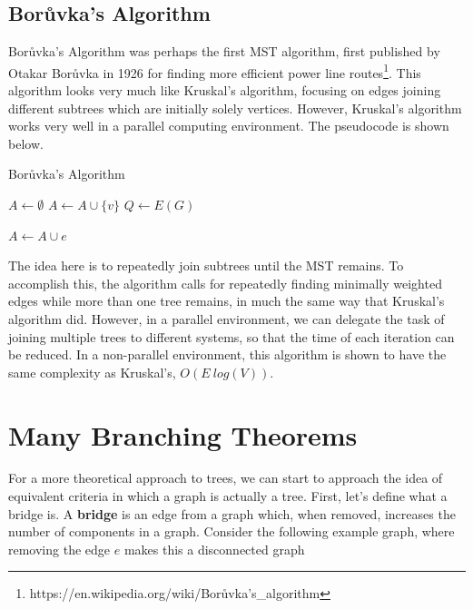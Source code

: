 \subsection{Bor\r{u}vka's Algorithm}
Bor\r{u}vka's Algorithm was perhaps the first MST algorithm, first published by Otakar Bor\r{u}vka in 1926 for finding more efficient power line routes\footnote{https://en.wikipedia.org/wiki/Borůvka's\_algorithm}. This algorithm looks very much like Kruskal's algorithm, focusing on edges joining different subtrees which are initially solely vertices. However, Kruskal's algorithm works very well in a parallel computing environment. The pseudocode is shown below.
\begin{algorithm}
    \DontPrintSemicolon
    \caption{Bor\r{u}vka's Algorithm}


    $A \gets \emptyset$\;
     {
        $A \gets A \cup \{v\}$\;
    }
    $Q \gets E(G)$\;
     {
         {
             {
                \;
                $A \gets A \cup e$\;
            }
        }

    }
\end{algorithm}

The idea here is to repeatedly join subtrees until the MST remains. To accomplish this, the algorithm calls for repeatedly finding minimally weighted edges while more than one tree remains, in much the same way that Kruskal's algorithm did. However, in a parallel environment, we can delegate the task of joining multiple trees to different systems, so that the time of each iteration can be reduced. In a non-parallel environment, this algorithm is shown to have the same complexity as Kruskal's, $O(E~log(V))$.

\section{Many Branching Theorems}
For a more theoretical approach to trees, we can start to approach the idea of equivalent criteria in which a graph is actually a tree. First, let's define what a bridge is. A \textbf{bridge} is an edge from a graph which, when removed, increases the number of components in a graph. Consider the following example graph, where removing the edge $e$ makes this a disconnected graph

